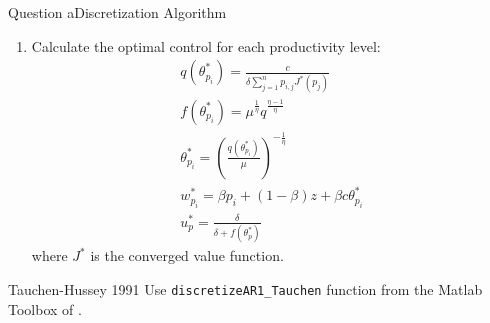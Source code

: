 \documentclass{beamer}
\begin{document}
\begin{frame}[allowframebreaks]{Question a}{Discretization Algorithm}
\begin{enumerate}
\begin{enumerate}
\begin{gather*}
                    J^{(1)}_{p_i} = p_i - w_{p_i} + \delta (1-s)\sum_{j=1}^{n}p_{i,j}J^{(0)}(p_j)
                \end{gather*}
                \item Choose a new grid point for productivity, go through 4.1 to 4.3. Once we have done the update for all productivity grid, we have new system of value function \({V^{(1)}_p}\)
                \item Compute distance between the two systems of value functions following the sup norm \[
                    d = \max\limits_{i\in\{1,\ldots,n\}}|V^{(0)}_i-V^{(1)}_i|\]
                \framebreak
                \item If distance is within the error tolerance level, \(d \leq tol * ||V^{(1)}_1||\), the functions have converged and go to step 5, or else go back to step 4.
            \end{enumerate}
            \item Calculate the optimal control for each productivity level:
            \begin{gather*}
                q(\theta^*_{p_i}) = \frac{c}{\delta \sum_{j=1}^{n}p_{i,j}J^* (p_j)}\\
                f(\theta^*_{p_i}) = \mu^\frac{1}{\eta} q^\frac{\eta-1}{\eta}\\
                \theta^*_{p_i} = (\frac{q(\theta^*_{p_i})}{\mu})^{-\frac{1}{\eta}}\\
                w^*_{p_i} = \beta p_i + (1-\beta)z + \beta c \theta^*_{p_i}\\
                u^*_p = \frac{\delta}{\delta + f(\theta^*_p)}
            \end{gather*}
            where \(J^*\) is the converged value function.
    \end{enumerate}
\end{frame}


\begin{frame}{Tauchen-Hussey 1991}
    Use \texttt{discretizeAR1\_Tauchen} function from the Matlab Toolbox of \cite{Kirkby2023} .
\end{frame}

    
    
\end{document}
